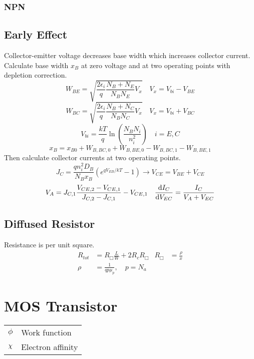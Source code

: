 \documentclass[a4paper, fontsize=8pt, landscape, DIV=1]{scrartcl}
\begin{document}
\begin{multicols*}{4}
    \subsubsection{NPN}

    \subsection{Early Effect}
    Collector-emitter voltage decreases base width which increases collector current.
    Calculate base width $x_B$ at zero voltage and at two operating points with depletion correction.
    \[W_{BE} = \sqrt{\frac{2\epsilon_i}{q}\frac{N_B+N_E}{N_BN_E}V_x} \quad V_x = V_{bi}-V_{BE} \]
    \[W_{BC} = \sqrt{\frac{2\epsilon_i}{q}\frac{N_B+N_C}{N_BN_C}V_x} \quad V_x = V_{bi}+V_{BC} \]
    \[V_{bi} = \frac{kT}{q}\ln\left(\frac{N_BN_i}{n_i^2}\right) \quad i=E, C\]
    \[x_B = x_{B0} + W_{B,BC,0} + W_{B,BE,0} - W_{B,BC,1} - W_{B,BE,1} \]
    Then calculate collector currents at two operating points.
    \[J_C = \frac{qn_i^2D_B}{N_Bx_B}\left(e^{qV_{EB}/kT}-1\right) \to V_{CE} = V_{BE} + V_{CE}\]
    \[V_A = J_{C,1}\frac{V_{CE,2}-V_{CE,1}}{J_{C,2}-J_{C,1}} - V_{CE,1} \quad \frac{\mathrm{d}I_C}{\mathrm{d}V_{EC}} = \frac{I_C}{V_A + V_{EC}} \]
    
    \subsection{Diffused Resistor}

    Resistance is per unit square.
    \begin{align*}
      R_{tot} &= R_\Box\frac{L}{W} + 2R_cR_\Box & R_\Box &= \frac{\rho}{x} \\
      \rho &= \frac{1}{qp\mu_p},\quad p=N_a
    \end{align*}

    \subsection{}


    \section{MOS Transistor}
    \begin{tabular}[h]{l l}
      $\phi$   & Work function \\
      $\altchi$    & Electron affinity \\
    \end{tabular}


\end{multicols*}
\end{document}
